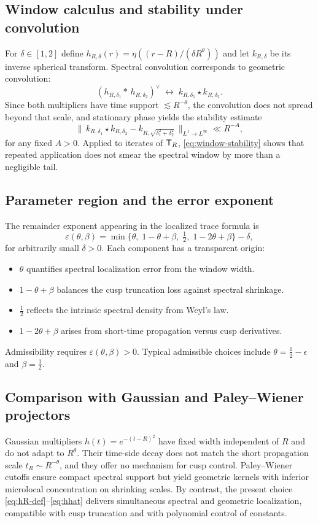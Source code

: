 \subsection{Window calculus and stability under convolution}\label{subsec:proj-windowcalc}
For $\delta\in[1,2]$ define $h_{R,\delta}(r)=\eta((r-R)/(\delta R^\theta))$ and let $k_{R,\delta}$ be its inverse spherical transform.
Spectral convolution corresponds to geometric convolution:
\[
(h_{R,\delta_1}\!*\,h_{R,\delta_2})^\vee
\;\longleftrightarrow\;
k_{R,\delta_1}\star k_{R,\delta_2}.
\]
Since both multipliers have time support $\lesssim R^{-\theta}$, the convolution does not spread beyond that scale, and stationary phase yields the stability estimate
\begin{equation}\label{eq:window-stability}
\big\|\,k_{R,\delta_1}\star k_{R,\delta_2}-k_{R,\sqrt{\delta_1^2+\delta_2^2}}\,\big\|_{L^1\to L^\infty}\ll R^{-A},
\end{equation}
for any fixed $A>0$.
Applied to iterates of $\mathsf{T}_R$, \eqref{eq:window-stability} shows that repeated application does not smear the spectral window by more than a negligible tail.

\subsection{Parameter region and the error exponent}\label{subsec:proj-params}
The remainder exponent appearing in the localized trace formula is
\[
\varepsilon(\theta,\beta)
=
\min\Big\{\theta,\;1-\theta+\beta,\;\tfrac12,\;1-2\theta+\beta\Big\}
-\delta,
\]
for arbitrarily small $\delta>0$.
Each component has a transparent origin:
\begin{itemize}
\item $\theta$ quantifies spectral localization error from the window width.
\item $1-\theta+\beta$ balances the cusp truncation loss against spectral shrinkage.
\item $\tfrac12$ reflects the intrinsic spectral density from Weyl’s law.
\item $1-2\theta+\beta$ arises from short-time propagation versus cusp derivatives.
\end{itemize}
Admissibility requires $\varepsilon(\theta,\beta)>0$.
Typical admissible choices include $\theta=\tfrac12-\epsilon$ and $\beta=\tfrac12$.

\subsection{Comparison with Gaussian and Paley–Wiener projectors}\label{subsec:proj-compare}
Gaussian multipliers $h(t)=e^{-(t-R)^2}$ have fixed width independent of $R$ and do not adapt to $R^\theta$.
Their time-side decay does not match the short propagation scale $t_R\sim R^{-\theta}$, and they offer no mechanism for cusp control.
Paley–Wiener cutoffs ensure compact spectral support but yield geometric kernels with inferior microlocal concentration on shrinking scales.
By contrast, the present choice \eqref{eq:hR-def}–\eqref{eq:hhat} delivers simultaneous spectral and geometric localization, compatible with cusp truncation and with polynomial control of constants.

